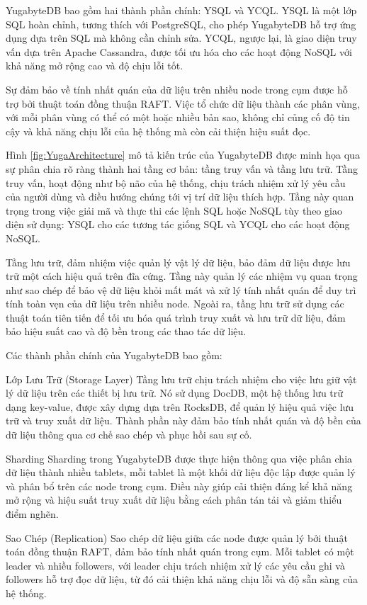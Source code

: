 \documentclass{article}[14pt]
\begin{document}
YugabyteDB bao gồm hai thành phần chính: YSQL và YCQL. YSQL là một lớp SQL hoàn chỉnh, tương thích với PostgreSQL, cho phép YugabyteDB hỗ trợ ứng dụng dựa trên SQL mà không cần chỉnh sửa. YCQL, ngược lại, là giao diện truy vấn dựa trên Apache Cassandra, được tối ưu hóa cho các hoạt động NoSQL với khả năng mở rộng cao và độ chịu lỗi tốt.

Sự đảm bảo về tính nhất quán của dữ liệu trên nhiều node trong cụm được hỗ trợ bởi thuật toán đồng thuận RAFT. Việc tổ chức dữ liệu thành các phân vùng, với mỗi phân vùng có thể có một hoặc nhiều bản sao, không chỉ củng cố độ tin cậy và khả năng chịu lỗi của hệ thống mà còn cải thiện hiệu suất đọc.

Hình \ref{fig:YugaArchitecture} mô tả kiến trúc của YugabyteDB được minh họa qua sự phân chia rõ ràng thành hai tầng cơ bản: tầng truy vấn và tầng lưu trữ. Tầng truy vấn, hoạt động như bộ não của hệ thống, chịu trách nhiệm xử lý yêu cầu của người dùng và điều hướng chúng tới vị trí dữ liệu thích hợp. Tầng này quan trọng trong việc giải mã và thực thi các lệnh SQL hoặc NoSQL tùy theo giao diện sử dụng: YSQL cho các tương tác giống SQL và YCQL cho các hoạt động NoSQL.

Tầng lưu trữ, đảm nhiệm việc quản lý vật lý dữ liệu, bảo đảm dữ liệu được lưu trữ một cách hiệu quả trên đĩa cứng. Tầng này quản lý các nhiệm vụ quan trọng như sao chép để bảo vệ dữ liệu khỏi mất mát và xử lý tính nhất quán để duy trì tính toàn vẹn của dữ liệu trên nhiều node. Ngoài ra, tầng lưu trữ sử dụng các thuật toán tiên tiến để tối ưu hóa quá trình truy xuất và lưu trữ dữ liệu, đảm bảo hiệu suất cao và độ bền trong các thao tác dữ liệu.

Các thành phần chính của YugabyteDB bao gồm:

Lớp Lưu Trữ (Storage Layer)
Tầng lưu trữ chịu trách nhiệm cho việc lưu giữ vật lý dữ liệu trên các thiết bị lưu trữ. Nó sử dụng DocDB, một hệ thống lưu trữ dạng key-value, được xây dựng dựa trên RocksDB, để quản lý hiệu quả việc lưu trữ và truy xuất dữ liệu. Thành phần này đảm bảo tính nhất quán và độ bền của dữ liệu thông qua cơ chế sao chép và phục hồi sau sự cố.

Sharding
Sharding trong YugabyteDB được thực hiện thông qua việc phân chia dữ liệu thành nhiều tablets, mỗi tablet là một khối dữ liệu độc lập được quản lý và phân bổ trên các node trong cụm. Điều này giúp cải thiện đáng kể khả năng mở rộng và hiệu suất truy xuất dữ liệu bằng cách phân tán tải và giảm thiểu điểm nghẽn.

Sao Chép (Replication)
Sao chép dữ liệu giữa các node được quản lý bởi thuật toán đồng thuận RAFT, đảm bảo tính nhất quán trong cụm. Mỗi tablet có một leader và nhiều followers, với leader chịu trách nhiệm xử lý các yêu cầu ghi và followers hỗ trợ đọc dữ liệu, từ đó cải thiện khả năng chịu lỗi và độ sẵn sàng của hệ thống.
\end{document}

